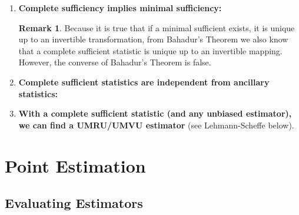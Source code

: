 \documentclass{article}
\theoremstyle{definition}
\newtheorem{theorem}{Theorem}
\theoremstyle{definition}
\theoremstyle{definition}
\theoremstyle{definition}
\theoremstyle{definition}
\newtheorem*{remark}{Remark}
\theoremstyle{definition}
\theoremstyle{definition}
\begin{document}
\begin{enumerate}[(1)]

\item \textbf{Complete sufficiency implies minimal sufficiency:}

\noindent{}

\begin{remark}Because it is true that if a minimal sufficient exists, it is unique up to an invertible transformation, from Bahadur's Theorem we also know that a complete sufficient statistic is unique up to an invertible mapping. However, the converse of Bahadur's Theorem is false.

\end{remark}

\item \textbf{Complete sufficient statistics are independent from ancillary statistics:}

\noindent{}

\item \textbf{With a complete sufficient statistic (and any unbiased estimator), we can find a UMRU/UMVU estimator} (see Lehmann-Scheffe below).

\end{enumerate}

\section{Point Estimation}

\subsection{Evaluating Estimators}
\end{document}
